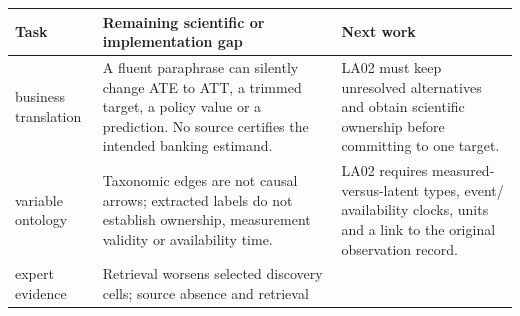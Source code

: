 \documentclass[
  10pt,
]{article}
\begin{document}
\begin{longtable}[]{@{}>{\raggedright\arraybackslash}p{}>{\raggedright\arraybackslash}p{}>{\raggedright\arraybackslash}p{}@{}}
\toprule
\begin{minipage}[b]{\linewidth}\raggedright
Task\strut
\end{minipage} & \begin{minipage}[b]{\linewidth}\raggedright
Remaining scientific or implementation gap\strut
\end{minipage} & \begin{minipage}[b]{\linewidth}\raggedright
Next work\strut
\end{minipage}\tabularnewline
\midrule
\endhead
\begin{minipage}[t]{\linewidth}\raggedright
business translation\strut
\end{minipage} & \begin{minipage}[t]{\linewidth}\raggedright
A fluent paraphrase can silently change ATE to ATT, a trimmed target, a
policy value or a prediction. No source certifies the intended banking
estimand.\strut
\end{minipage} & \begin{minipage}[t]{\linewidth}\raggedright
LA02 must keep unresolved alternatives and obtain scientific ownership
before committing to one target.\strut
\end{minipage}\tabularnewline
\begin{minipage}[t]{\linewidth}\raggedright
variable ontology\strut
\end{minipage} & \begin{minipage}[t]{\linewidth}\raggedright
Taxonomic edges are not causal arrows; extracted labels do not establish
ownership, measurement validity or availability time.\strut
\end{minipage} & \begin{minipage}[t]{\linewidth}\raggedright
LA02 requires measured-versus-latent types, event/ availability clocks,
units and a link to the original observation record.\strut
\end{minipage}\tabularnewline
\begin{minipage}[t]{\linewidth}\raggedright
expert evidence\strut
\end{minipage} & \begin{minipage}[t]{\linewidth}\raggedright
Retrieval worsens selected discovery cells; source absence and retrieval

\end{minipage}
\end{longtable}
\end{document}
